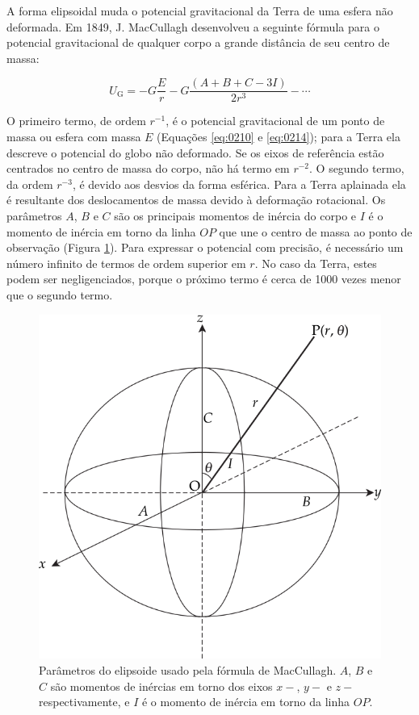 \documentclass[]{book}
\theoremstyle{definition}
\theoremstyle{definition}
\theoremstyle{definition}
\theoremstyle{remark}
\begin{document}
A forma elipsoidal muda o potencial gravitacional da Terra de uma esfera não deformada. Em 1849, J. MacCullagh desenvolveu a seguinte fórmula para o potencial gravitacional de qualquer corpo a grande distância de seu centro de massa:

\begin{equation}
U_{\mathrm{G}}=-G \frac{E}{r}-G \frac{(A+B+C-3 I)}{2 r^{3}}-\cdots \label{eq:0220}
\end{equation}

O primeiro termo, de ordem \(r^{-1}\), é o potencial gravitacional de um ponto de massa ou esfera com massa \(E\) (Equações \eqref{eq:0210} e \eqref{eq:0214}); para a Terra ela descreve o potencial do globo não deformado. Se os eixos de referência estão centrados no centro de massa do corpo, não há termo em \(r^{-2}\). O segundo termo, da ordem \(r^{-3}\), é devido aos desvios da forma esférica. Para a Terra aplainada ela é resultante dos deslocamentos de massa devido à deformação rotacional. Os parâmetros \(A\), \(B\) e \(C\) são os principais momentos de inércia do corpo e \(I\) é o momento de inércia em torno da linha \(OP\) que une o centro de massa ao ponto de observação (Figura \ref{fig:elipsoide2}). Para expressar o potencial com precisão, é necessário um número infinito de termos de ordem superior em \(r\). No caso da Terra, estes podem ser negligenciados, porque o próximo termo é cerca de 1000 vezes menor que o segundo termo.

\begin{figure}

{\centering \includegraphics[width=0.4\linewidth]{fig/Fig_02.21} 

}

\caption{Parâmetros do elipsoide usado pela fórmula de MacCullagh. $A$, $B$ e $C$ são momentos de inércias em torno dos eixos $x-$, $y-$ e $z-$ respectivamente, e $I$ é o momento de inércia em torno da linha $OP$.}\label{fig:elipsoide2}
\end{figure}
\end{document}
